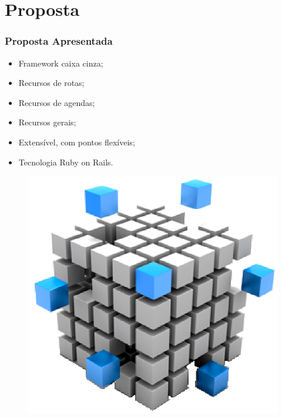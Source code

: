 \documentclass{beamer}
\begin{document}
\section{Proposta}

\begin{frame}
\frametitle{Proposta Apresentada}

\begin{itemize}
	\item Framework caixa cinza;
	\item Recursos de rotas;
	\item Recursos de agendas;
	\item Recursos gerais;
	\item Extensível, com pontos flexíveis;
	\item Tecnologia Ruby on Rails.
\end{itemize}

\begin{figure}[h]
	\centering
	\includegraphics[scale=0.35]{figuras/framework.eps}
\end{figure}

\end{frame}
\end{document}
